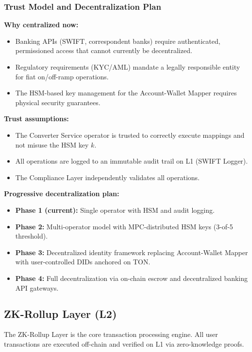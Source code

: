 \documentclass[12pt,a4paper]{article}
\theoremstyle{definition}
\theoremstyle{remark}
\begin{document}
\subsubsection{Trust Model and Decentralization Plan}

\textbf{Why centralized now:}
\begin{itemize}[nosep]
    \item Banking APIs (SWIFT, correspondent banks) require authenticated, permissioned access that cannot currently be decentralized.
    \item Regulatory requirements (KYC/AML) mandate a legally responsible entity for fiat on/off-ramp operations.
    \item The HSM-based key management for the Account-Wallet Mapper requires physical security guarantees.
\end{itemize}

\textbf{Trust assumptions:}
\begin{itemize}[nosep]
    \item The Converter Service operator is trusted to correctly execute mappings and not misuse the HSM key $k$.
    \item All operations are logged to an immutable audit trail on L1 (SWIFT Logger).
    \item The Compliance Layer independently validates all operations.
\end{itemize}

\textbf{Progressive decentralization plan:}
\begin{itemize}[nosep]
    \item \textbf{Phase 1 (current):} Single operator with HSM and audit logging.
    \item \textbf{Phase 2:} Multi-operator model with MPC-distributed HSM keys (3-of-5 threshold).
    \item \textbf{Phase 3:} Decentralized identity framework replacing Account-Wallet Mapper with user-controlled DIDs anchored on TON.
    \item \textbf{Phase 4:} Full decentralization via on-chain escrow and decentralized banking API gateways.
\end{itemize}

\subsection{ZK-Rollup Layer (L2)}
\label{sec:zk-rollup-layer}

The ZK-Rollup Layer is the core transaction processing engine. All user transactions are executed off-chain and verified on L1 via zero-knowledge proofs.
\end{document}
